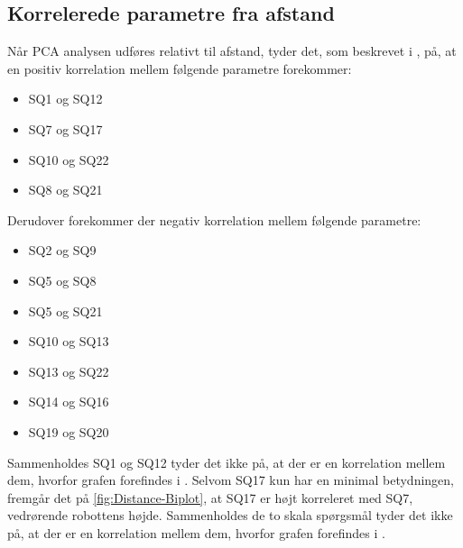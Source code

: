\subsection{Korrelerede parametre fra afstand}
\label{DatabehandlingSammenligningKorreleredeAfstand}
%
Når PCA analysen udføres relativt til afstand, tyder det, som beskrevet i , på, at en positiv korrelation mellem følgende parametre forekommer:
%
\begin{itemize}
	\item SQ1 og SQ12
	\item SQ7 og SQ17
	\item SQ10 og SQ22
	\item SQ8 og SQ21\blankline
\end{itemize}
\noindent
%
Derudover forekommer der negativ korrelation mellem følgende parametre:
%
\begin{itemize}
	\item SQ2 og SQ9
	\item SQ5 og SQ8
	\item SQ5 og SQ21
	\item SQ10 og SQ13
	\item SQ13 og SQ22
	\item SQ14 og SQ16
	\item SQ19 og SQ20\blankline
\end{itemize}
\noindent
%
Sammenholdes SQ1 og SQ12 tyder det ikke på, at der er en korrelation mellem dem, hvorfor grafen forefindes i . Selvom SQ17 kun har en minimal betydningen, fremgår det på \autoref{fig:Distance-Biplot}, at SQ17 er højt korreleret med SQ7, vedrørende robottens højde. Sammenholdes de to skala spørgsmål tyder det ikke på, at der er en korrelation mellem dem, hvorfor grafen forefindes i .

